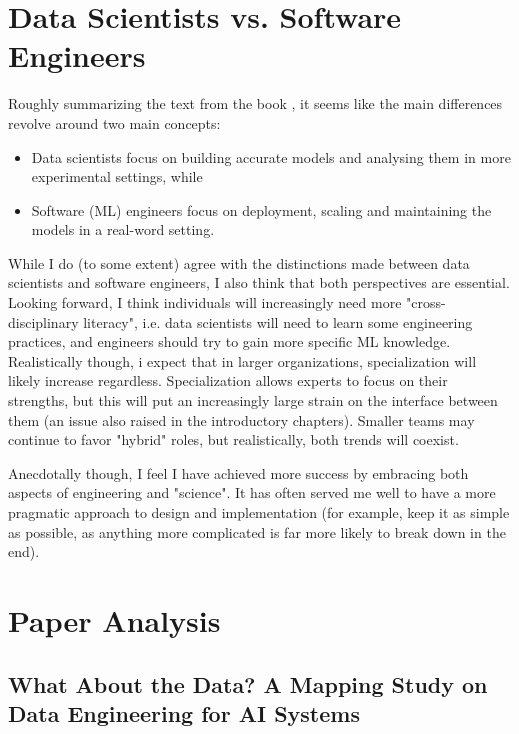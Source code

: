 \documentclass[11pt,compsoc,a4paper]{IEEEtran}
\begin{document}
\section{Data Scientists vs. Software Engineers}

    Roughly summarizing the text from the book \cite{kastner2025mlprod}, it seems like the main differences revolve around two main concepts:
    \begin{itemize}
        \item Data scientists focus on building accurate models and analysing them in more experimental settings, while
        \item Software (ML) engineers focus on deployment, scaling and maintaining the models in a real-word setting.
    \end{itemize}

    \noindent While I do (to some extent) agree with the distinctions made between data scientists and software engineers, I also think that both perspectives are essential. Looking forward, I think individuals will increasingly need more "cross-disciplinary literacy", i.e. data scientists will need to learn some engineering practices, and engineers should try to gain more specific ML knowledge. Realistically though, i expect that in larger organizations, specialization will likely increase regardless. Specialization allows experts to focus on their strengths, but this will put an increasingly large strain on the interface between them (an issue also raised in the introductory chapters). Smaller teams may continue to favor "hybrid" roles, but realistically, both trends will coexist.

    Anecdotally though, I feel I have achieved more success by embracing both aspects of engineering and "science". It has often served me well to have a more pragmatic approach to design and implementation (for example, keep it as simple as possible, as anything more complicated is far more likely to break down in the end).

\newpage
\section{Paper Analysis}
    \vspace{0.5cm}
   
    \subsection*{What About the Data? A Mapping Study on Data Engineering for AI Systems}
\end{document}
